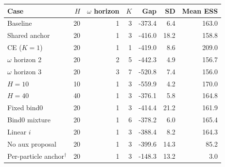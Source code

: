 \begin{tabular}{lrrrrrr}
\toprule
Case & $H$ & $\omega$ horizon & $K$ & Gap & SD & Mean ESS \\
\midrule
Baseline & 20 & 1 & 3 & -373.4 & 6.4 & 163.0 \\
Shared anchor & 20 & 1 & 3 & -416.0 & 18.2 & 158.8 \\
CE ($K{=}1$) & 20 & 1 & 1 & -419.0 & 8.6 & 209.0 \\
$\omega$ horizon 2 & 20 & 2 & 5 & -442.3 & 4.9 & 156.7 \\
$\omega$ horizon 3 & 20 & 3 & 7 & -520.8 & 7.4 & 156.0 \\
$H{=}10$ & 10 & 1 & 3 & -559.9 & 4.2 & 170.0 \\
$H{=}40$ & 40 & 1 & 3 & -376.1 & 5.8 & 164.8 \\
Fixed bind0 & 20 & 1 & 3 & -414.4 & 21.2 & 161.9 \\
Bind0 mixture & 20 & 1 & 6 & -378.2 & 6.0 & 165.4 \\
Linear $i$ & 20 & 1 & 3 & -388.4 & 8.2 & 164.3 \\
No aux proposal & 20 & 1 & 3 & -399.6 & 14.3 & 85.2 \\
Per-particle anchor$^{\dagger}$ & 20 & 1 & 3 & -148.3 & 13.2 & 3.0 \\
\bottomrule
\end{tabular}
